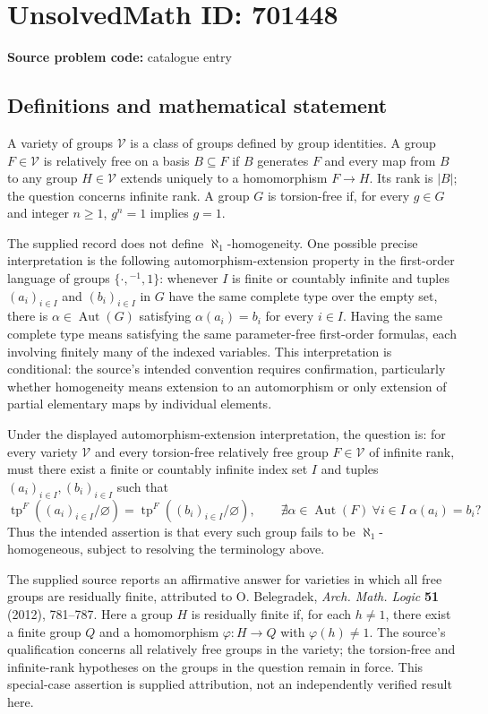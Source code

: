 \documentclass[11pt]{article}
\begin{document}
\section*{UnsolvedMath ID: 701448}
\textbf{Source problem code:} catalogue entry
\subsection{Definitions and mathematical statement}
A variety of groups \(\mathcal V\) is a class of groups defined by group identities. A group \(F\in\mathcal V\) is relatively free on a basis \(B\subseteq F\) if \(B\) generates \(F\) and every map from \(B\) to any group \(H\in\mathcal V\) extends uniquely to a homomorphism \(F\to H\). Its rank is \(|B|\); the question concerns infinite rank. A group \(G\) is torsion-free if, for every \(g\in G\) and integer \(n\geq 1\), \(g^n=1\) implies \(g=1\).

The supplied record does not define \(\aleph_1\)-homogeneity. One possible precise interpretation is the following automorphism-extension property in the first-order language of groups \(\{\cdot,{}^{-1},1\}\): whenever \(I\) is finite or countably infinite and tuples \((a_i)_{i\in I}\) and \((b_i)_{i\in I}\) in \(G\) have the same complete type over the empty set, there is \(\alpha\in\operatorname{Aut}(G)\) satisfying \(\alpha(a_i)=b_i\) for every \(i\in I\). Having the same complete type means satisfying the same parameter-free first-order formulas, each involving finitely many of the indexed variables. This interpretation is conditional: the source's intended convention requires confirmation, particularly whether homogeneity means extension to an automorphism or only extension of partial elementary maps by individual elements.

Under the displayed automorphism-extension interpretation, the question is: for every variety \(\mathcal V\) and every torsion-free relatively free group \(F\in\mathcal V\) of infinite rank, must there exist a finite or countably infinite index set \(I\) and tuples \((a_i)_{i\in I},(b_i)_{i\in I}\) such that
\[
\operatorname{tp}^{F}((a_i)_{i\in I}/\varnothing)
=
\operatorname{tp}^{F}((b_i)_{i\in I}/\varnothing),
\qquad
\nexists\alpha\in\operatorname{Aut}(F)\ \forall i\in I\;\alpha(a_i)=b_i?
\]
Thus the intended assertion is that every such group fails to be \(\aleph_1\)-homogeneous, subject to resolving the terminology above.

The supplied source reports an affirmative answer for varieties in which all free groups are residually finite, attributed to O. Belegradek, \emph{Arch. Math. Logic} \textbf{51} (2012), 781--787. Here a group \(H\) is residually finite if, for each \(h\neq 1\), there exist a finite group \(Q\) and a homomorphism \(\varphi:H\to Q\) with \(\varphi(h)\neq 1\). The source's qualification concerns all relatively free groups in the variety; the torsion-free and infinite-rank hypotheses on the groups in the question remain in force. This special-case assertion is supplied attribution, not an independently verified result here.
\end{document}
